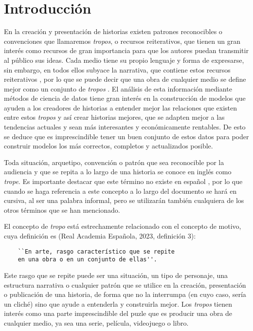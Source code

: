 \chapter{Introducción}
En la creación y presentación de historias existen patrones reconocibles o
convenciones que llamaremos \textit{tropos}, o recursos reiterativos, que tienen
un gran interés como recursos de gran importancia para que los autores puedan
transmitir al público sus ideas. Cada medio tiene su propio lenguaje y forma de
expresarse, sin embargo, en todos ellos subyace la narrativa, que contiene estos
recursos reiterativos \cite{garcia2021simpsons}, por lo que se puede decir que
una obra de cualquier medio se define mejor como un conjunto de \textit{tropos}
\cite{garcia2020tropes}. El análisis de esta información mediante métodos de
ciencia de datos tiene gran interés en la construcción de modelos que ayuden a
los creadores de historias a entender mejor las relaciones que existen entre
estos \textit{tropos} y así crear historias mejores, que se adapten mejor a las
tendencias actuales y sean más interesantes y económicamente rentables. De esto
se deduce que es imprescindible tener un buen conjunto de estos datos para poder
construir modelos los más correctos, completos y actualizados posible.

Toda situación, arquetipo, convención o patrón que sea reconocible por la
audiencia y que se repita a lo largo de una historia se conoce en inglés como
\textit{trope}. Es importante destacar que este término no existe en español
\cite{tesisruben}, por lo que cuando se haga referencia a este concepto a lo
largo del documento se hará en cursiva, al ser una palabra informal, pero se
utilizarán también cualquiera de los otros términos que se han mencionado.

El concepto de \textit{tropo} está estrechamente relacionado con el concepto de
motivo, cuya definición es (Real Academia Española, 2023, definición 3): 

\begin{verbatim}
    ``En arte, rasgo característico que se repite 
    en una obra o en un conjunto de ellas''.
\end{verbatim}


Este rasgo que se repite puede ser una situación, un tipo de personaje, una
estructura narrativa o cualquier patrón que se utilice en la creación,
presentación o publicación de una historia, de forma que no la interrumpa (en
cuyo caso, sería un cliché) sino que ayude a entenderla y construirla mejor. Los
\textit{tropos} tienen interés como una parte imprescindible del puzle que es
producir una obra de cualquier medio, ya sea una serie, película, videojuego o
libro. 


